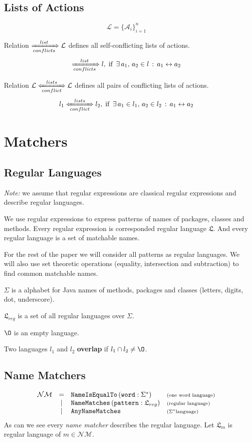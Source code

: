 \documentclass{article}
\newcommand{\cActions}{\leftrightarrow}
\newcommand{\cList}{\xRightarrow[conflicts]{list}}
\newcommand{\cLists}{\xLeftrightarrow[conflict]{lists}}
\newcommand{\lang}{\mathfrak{L}}
\newcommand{\regL}{\lang_{reg}}
\newcommand{\fullL}{$\Sigma^*$}
\newcommand{\descr}[1]{\mbox{\scriptsize ({#1})}}
\begin{document}
\subsection{Lists of Actions}

\[\mathcal{L} = \{\mathcal{A}_i\}_{i=1}^{n}\]

\noindent Relation $\cList \mathcal{L}$ defines all self-conflicting lists of actions.
\[
\cList l,\; \mbox{if }\, \exists\, a_1,\, a_2 \in l\, : \, a_1 \cActions a_2
\]

\noindent Relation $\mathcal{L} \cLists \mathcal{L}$ defines all pairs of conflicting lists of actions.
\[
l_1 \cLists l_2,\; \mbox{if }\, \exists\, a_1 \in l_1,\, a_2 \in l_2\, : \, a_1 \cActions a_2
\]


\section{Matchers}
\subsection{Regular Languages}

\textit{Note:} we assume that regular expressions are classical regular expressions and describe regular languages.

We use regular expressions to express patterns of names of packages, classes and methods. Every regular expression is corresponded regular language $\lang$. And every regular language is a set of matchable names.

For the rest of the paper we will consider all patterns as regular languages. We will also use set theoretic operations (equality, intersection and subtraction) to find common matchable names.

$\Sigma$ is a alphabet for Java names of methods, packages and classes (letters, digits, dot, underscore).

$\regL$ is a set of all regular languages over $\Sigma$.

$\O$ is an empty language.

Two languages $l_1$ and $l_2$  \textbf{overlap} if $l_1 \cap l_2 \not= \O$.

\subsection{Name Matchers}

\[
\begin{array}{rcll}
\mathcal{NM} & =    & \texttt{NameIsEqualTo}\,(\texttt{word} : \Sigma^*) & \descr{one word language} \\
             & \mid & \texttt{NameMatches}\,(\texttt{pattern} : \regL) & \descr{regular language} \\
             & \mid & \texttt{AnyNameMatches} & \descr{\fullL language}
\end{array}
\]
\noindent As can we see every \textit{name matcher} describes the regular language. Let $\lang_m$ is regular language of $m \in \mathcal{NM}$.
\end{document}
